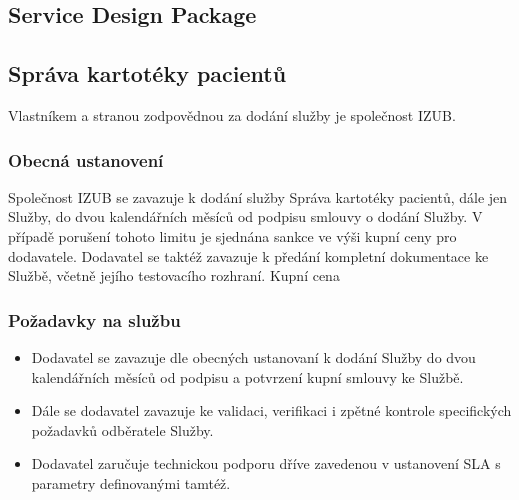 \documentclass[11pt, a4paper, titlepage]{article}
\begin{document}
	
	\pagestyle{fancy}

	\begin{center}
		\section*{Service Design Package}
	\end{center}

	\subsection*{Správa kartotéky pacientů}

	Vlastníkem a stranou zodpovědnou za dodání služby je společnost IZUB. 

	\subsubsection*{Obecná ustanovení}

	Společnost IZUB se zavazuje k dodání služby Správa kartotéky pacientů, dále jen Služby, do dvou kalendářních měsíců od podpisu smlouvy o dodání Služby. V případě porušení tohoto limitu je sjednána sankce ve výši kupní ceny pro dodavatele. Dodavatel se taktéž zavazuje k předání kompletní dokumentace ke Službě, včetně jejího testovacího rozhraní. Kupní cena 

	\subsubsection*{Požadavky na službu}

	\begin{itemize}
		\item Dodavatel se zavazuje dle obecných ustanovaní k dodání Služby do dvou kalendářních měsíců od podpisu a potvrzení kupní smlouvy ke Službě. 
		\item Dále se dodavatel zavazuje ke validaci, verifikaci i zpětné kontrole specifických požadavků odběratele Služby.
		\item Dodavatel zaručuje technickou podporu dříve zavedenou v ustanovení SLA s parametry definovanými tamtéž.
	\end{itemize}
\end{document}
